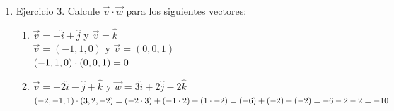 \documentclass[10pt,letterpaper,fleqn]{article}
\begin{document}
\begin{enumerate}
        \item Ejercicio 3. Calcule $\overrightarrow{v} \cdot \overrightarrow{w}$
        para los siguientes vectores:
        \begin{enumerate}
          \item
          $\overrightarrow{v} = -\widehat{i}+\widehat{j}$ y
          $\overrightarrow{v} = \widehat{k}$ \\
            $\overrightarrow{v} = (-1,1,0)$ y
            $\overrightarrow{v} = (0,0,1)$ \\
            $
              (-1,1,0) \cdot (0,0,1) \\
              = 0
            $
            \\
          \item
          $\overrightarrow{v} = -2\widehat{i} -\widehat{j} + \widehat{k}$ y
          $\overrightarrow{w} = 3\widehat{i} + 2\widehat{j} -2\widehat{k}$
            $
              (-2,-1,1) \cdot (3,2,-2) \\
              = (-2\cdot 3) + (-1\cdot 2) + (1\cdot -2) \\
              = (-6) + (-2) + (-2) \\
              = - 6 - 2 - 2 \\
              = -10
            $
        \end{enumerate}


\end{enumerate}
\end{document}

